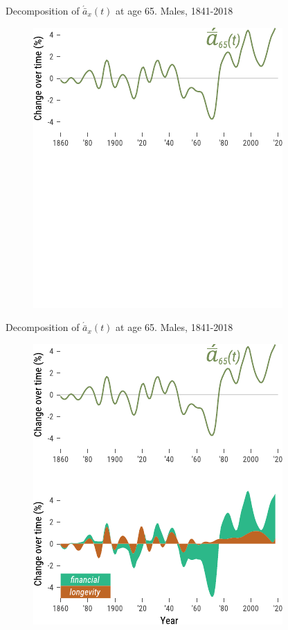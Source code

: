 \documentclass[10pt]{beamer}
\begin{document}
\begin{frame}{Decomposition of $\acute{\bar{a}}_x(t)$ at age 65. Males, 1841-2018}
\begin{figure}
	\centering
	\hspace*{-0.9cm}
	\includegraphics[scale=1.2] {Fig/DescSingle0.pdf}
\end{figure}
\end{frame}

\begin{frame}{Decomposition of $\acute{\bar{a}}_x(t)$ at age 65. Males, 1841-2018}
\begin{figure}
	\centering
	\hspace*{-0.9cm}
	\includegraphics[scale=1.2] {Fig/DescSingle.pdf}
\end{figure}
\end{frame}
\end{document}

